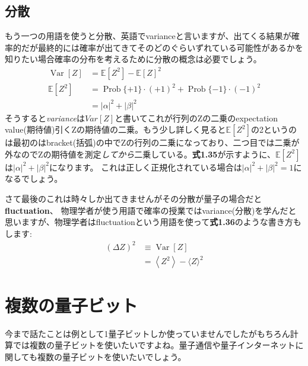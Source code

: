 \subsection{分散}
もう一つの用語を使うと分散、英語でvarianceと言いますが、出てくる結果が確率的だが最終的には確率が出てきてそのどのぐらいずれている可能性があるかを知りたい場合確率の分布を考えるために分散の概念は必要でしょう。
\begin{equation}
\begin{aligned}
\operatorname{Var}[Z] &=\mathbb{E}\left[Z^{2}\right]-\mathbb{E}[Z]^{2} \\
\mathbb{E}\left[Z^{2}\right] &=\operatorname{Prob}\{+1\} \cdot(+1)^{2}+\operatorname{Prob}\{-1\} \cdot(-1)^{2} \\
&=|\alpha|^{2}+|\beta|^{2}
\end{aligned}
\end{equation}
そうすると\emph{variance}は$Var[Z]$と書いてこれが行列のZの二乗のexpectation value(期待値)引くZの期待値の二乗。もう少し詳しく見ると$\mathbb{E}[Z^2]$の2というのは最初のはbracket(括弧)の中でZの行列の二乗になっており、二つ目では二乗が外なのでZの期待値を測定\emph{してから}二乗している。\textbf{式1.35}が示すように、$\mathbb{E}[Z^2]$は$|\alpha|^2 + |\beta|^2$になります。
これは正しく正規化されている場合は$|\alpha|^2 + |\beta|^2 = 1$になるでしょう。

さて最後のこれは時々しか出てきませんがその分散が量子の場合だと\textbf{fluctuation}、 物理学者が使う用語で確率の授業ではvariance(分散)を学んだと思いますが、物理学者はfluctuationという用語を使って\textbf{式1.36}のような書き方もします:
\begin{equation}
\begin{aligned}
(\Delta Z)^{2} & \equiv \operatorname{Var}[Z] \\
&=\left\langle Z^{2}\right\rangle-\langle Z\rangle^{2}
\end{aligned}
\end{equation}

\section{複数の量子ビット}
今まで話たことは例として1量子ビットしか使っていませんでしたがもちろん計算では複数の量子ビットを使いたいですよね。量子通信や量子インターネットに
関しても複数の量子ビットを使いたいでしょう。

